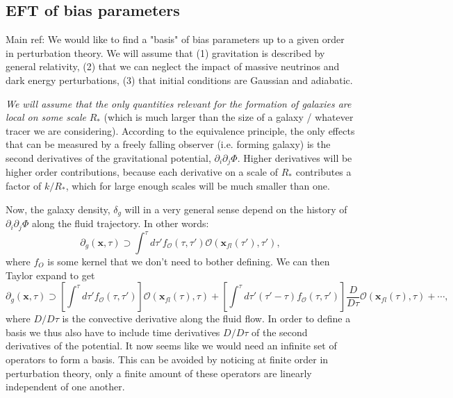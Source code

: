 \documentclass[11pt]{book}
\newcommand{\sbr}[1]{\ensuremath{\left[ #1 \right]}}
\begin{document}
\subsection{EFT of bias parameters}
Main ref: \cite{Desjacques_2018}
We would like to find a "basis" of bias parameters up to a given order in perturbation theory. We will assume that (1) gravitation is described by general relativity, (2) that we can neglect the impact of massive neutrinos and dark energy perturbations, (3) that initial conditions are Gaussian and adiabatic.

\emph{We will assume that the only quantities relevant for the formation of galaxies are local on some scale} $R_*$ (which is much larger than the size of a galaxy / whatever tracer we are considering). According to the equivalence principle, the only effects that can be measured by a freely falling observer (i.e. forming galaxy) is the second derivatives of the gravitational potential, $\partial_i \partial_j \Phi$. Higher derivatives will be higher order contributions, because each derivative on a scale of $R_*$ contributes a factor of $k/R_*$, which for large enough scales will be much smaller than one.

Now, the galaxy density, $\delta_g$ %
will in a very general sense depend on the history of $\partial_i \partial_j \Phi$ along the fluid trajectory. In other words:
\begin{equation}
    \partial_g(\mathbf x, \tau) \supset \int^\tau d\tau'f_{\mathcal O }(\tau, \tau') \mathcal O (\mathbf x_{fl}(\tau'), \tau'),
\end{equation}
where $f_O$ is some kernel that we don't need to bother defining. %
We can then Taylor expand to get
\begin{equation}
    \partial_g(\mathbf x, \tau) \supset \sbr{\int^\tau d\tau'f_{\mathcal O }(\tau, \tau')} \mathcal O (\mathbf x_{fl}(\tau), \tau) + \sbr{\int^\tau d\tau' (\tau'-\tau) f_{\mathcal O }(\tau, \tau')} \frac{D}{D\tau}\mathcal O (\mathbf x_{fl}(\tau), \tau) + \cdots,
\end{equation}
where $D/D\tau$ is the convective derivative along the fluid flow. %
In order to define a basis we thus also have to include time derivatives $D/D\tau$ of the second derivatives of the potential. It now seems like we would need an infinite set of operators to form a basis. This can be avoided by noticing at finite order in perturbation theory, only a finite amount of these operators are linearly independent of one another.
\end{document}
